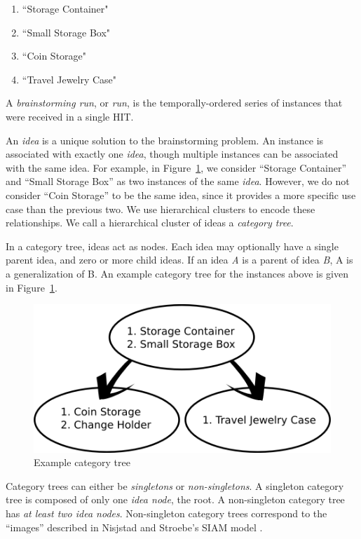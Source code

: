 \begin{enumerate}
    \item ``Storage Container"
    \item ``Small Storage Box"
    \item ``Coin Storage"
    \item ``Travel Jewelry Case"
\end{enumerate}

A \emph{brainstorming run}, or \emph{run}, is the temporally-ordered series of instances that were received in a single HIT.

An \emph{idea} is a unique solution to the brainstorming problem. An instance is associated with exactly one \emph{idea}, though multiple instances can be associated with the same idea. For example, in Figure~\ref{fig:example_instances}, we consider ``Storage Container'' and ``Small Storage Box'' as two instances of the same \emph{idea}. However, we do not consider ``Coin Storage'' to be the same idea, since it provides a more specific use case than the previous two. We use hierarchical clusters to encode these relationships. We call a hierarchical cluster of ideas a \emph{category tree}.

In a category tree, ideas act as nodes. Each idea may optionally have a single parent idea, and zero or more child ideas. If an idea \emph{A} is a parent of idea \emph{B}, A is a generalization of B. An example category tree for the instances above is given in Figure~\ref{fig:example_instances}.

\begin{figure}[!h]
    \centering
    \includegraphics[width=0.9\columnwidth]{example_instances}
    \caption{Example category tree}
    \label{fig:example_instances}
\end{figure}

Category trees can either be \emph{singletons} or \emph{non-singletons}. A singleton category tree is composed of only one \emph{idea node}, the root. A non-singleton category tree has \emph{at least two idea nodes}. Non-singleton category trees correspond to the ``images'' described in Nisjstad and Stroebe's SIAM model \cite{nijstad_how_2006}.


